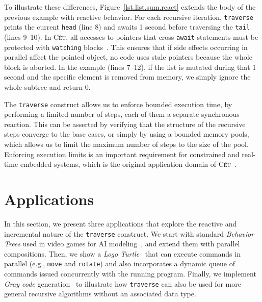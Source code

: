 \documentclass{acm_proc_article-sp}
\newcommand{\CEU}{\textsc{C\'{e}u}\xspace}
\newcommand{\code}[1] {{\small{\texttt{#1}}}}
\begin{document}
To illustrate these differences, Figure~\ref{lst.list.sum.react} extends the body
of the previous example with reactive behavior.
For each recursive iteration, \code{traverse} prints the current 
\code{head} (line 8) and awaits 1 second before traversing the \code{tail} 
(lines 9--10).
In \CEU, all accesses to pointers that cross \code{await} statements must be 
protected with \code{watching} blocks~\cite{ceu.mod15}.
This ensures that if side effects occurring in parallel affect the pointed 
object, no code uses stale pointers because the whole block is aborted.
In the example (lines 7--12), if the list is mutated during that 1 second and 
the specific element is removed from memory, we simply ignore the whole subtree 
and return 0.

The \code{traverse} construct allows us to enforce bounded execution time, by
performing a limited number of steps, each of them a separate synchronous
reaction. This can be asserted by verifying that the structure of the
recursive steps converge to the base cases, or simply by using a bounded
memory pools, which allows us to limit the maximum number of steps to the size
of the pool. Enforcing execution limits is an important requirement for
constrained and real-time embedded systems, which is the original application
domain of \CEU~\cite{ceu.sensys13}.

\section{Applications}

In this section, we present three applications that explore the reactive and 
incremental nature of the \code{traverse} construct.
We start with standard \emph{Behavior Trees} used in video games for AI 
modeling~\cite{TODO}, and extend them with parallel compositions.
Then, we show a \emph{Logo Turtle}~\cite{TODO} that can execute commands in 
parallel (e.g., \code{move} and \code{rotate}) and also incorporates a dynamic 
queue of commands issued concurrently with the running program.
Finally, we implement \emph{Gray code} generation~\cite{TODO} to illustrate how 
\code{traverse} can also be used for more general recursive algorithms without 
an associated data type.
\end{document}
